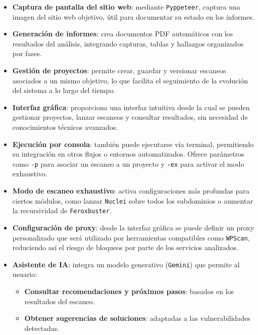 \begin{parskipenv}
\begin{itemize}
\begin{itemize}
        \item \textbf{FTP}: analiza si permite acceso anónimo, realiza fuerza bruta con \texttt{ftplib}, verifica permisos y descarga el contenido disponible.
        \item \textbf{SSH}: realiza ataques de fuerza bruta con \texttt{Hydra} y utiliza \texttt{Searchsploit} para identificar vulnerabilidades según la versión detectada.
    \end{itemize}
  \item \textbf{Captura de pantalla del sitio web}: mediante \texttt{Pyppeteer}, captura una imagen del sitio web objetivo, útil para documentar su estado en los informes.
  \item \textbf{Generación de informes}: crea documentos PDF automáticos con los resultados del análisis, integrando capturas, tablas y hallazgos organizados por fases.
  \item \textbf{Gestión de proyectos}: permite crear, guardar y versionar escaneos asociados a un mismo objetivo, lo que facilita el seguimiento de la evolución del sistema a lo largo del tiempo.
  \item \textbf{Interfaz gráfica}: proporciona una interfaz intuitiva desde la cual se pueden gestionar proyectos, lanzar escaneos y consultar resultados, sin necesidad de conocimientos técnicos avanzados.
  \item \textbf{Ejecución por consola}: también puede ejecutarse vía terminal, permitiendo su integración en otros flujos o entornos automatizados. Ofrece parámetros como \texttt{-p} para asociar un escaneo a un proyecto y \texttt{-ex} para activar el modo exhaustivo.
  \item \textbf{Modo de escaneo exhaustivo}: activa configuraciones más profundas para ciertos módulos, como lanzar \texttt{Nuclei} sobre todos los subdominios o aumentar la recursividad de \texttt{Feroxbuster}.
  \item \textbf{Configuración de proxy}: desde la interfaz gráfica se puede definir un proxy personalizado que será utilizado por herramientas compatibles como \texttt{WPScan}, reduciendo así el riesgo de bloqueos por parte de los servicios analizados.
  \item \textbf{Asistente de IA}: integra un modelo generativo (\texttt{Gemini}) que permite al usuario:
    \begin{itemize}
        \item \textbf{Consultar recomendaciones y próximos pasos}: basados en los resultados del escaneo.
        \item \textbf{Obtener sugerencias de soluciones}: adaptadas a las vulnerabilidades detectadas.
    \end{itemize}
\end{itemize}


\end{parskipenv}
